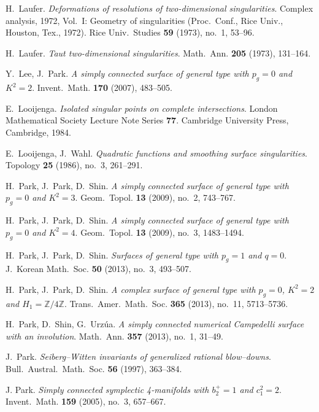 \documentclass[a4paper, reqno, twoside]{amsart}
\theoremstyle{definition}
\numberwithin{equation}{section}
\begin{document}
\begin{thebibliography}{99}
 H.~Laufer. \textit{Deformations of resolutions
  of two-dimensional singularities}. Complex analysis, 1972, Vol.~I:
  Geometry of singularities (Proc.~Conf., Rice Univ., Houston, Tex.,
  1972). Rice Univ.~Studies \textbf{59} (1973), no.~1, 53--96.

 H.~Laufer. \textit{Taut two-dimensional singularities}. Math.~Ann. \textbf{205} (1973), 131--164.

 Y.~Lee, J.~Park. \textit{A simply connected surface of general type with $p_g=0$ and $K^2=2$}. Invent.~Math. \textbf{170} (2007), 483--505.

 E.~Looijenga. \textit{Isolated singular points on complete intersections}. London Mathematical Society Lecture Note Series \textbf{77}. Cambridge University Press, Cambridge, 1984.

 E.~Looijenga, J.~Wahl. \textit{Quadratic functions and smoothing surface singularities}. Topology \textbf{25} (1986), no.~3, 261--291.

 H.~Park, J.~Park, D.~Shin. \textit{A simply connected surface of general type with $p_g=0$ and $K^2=3$}. Geom.~Topol. \textbf{13} (2009), no.~2, 743--767.

 H.~Park, J.~Park, D.~Shin. \textit{A simply connected surface of general type with $p_g=0$ and $K^2=4$}. Geom.~Topol. \textbf{13} (2009), no.~3, 1483--1494.

 H.~Park, J.~Park, D.~Shin. \textit{Surfaces of general type with $p_g=1$ and $q=0$}. J.~Korean Math.~Soc. \textbf{50} (2013), no.~3,
493--507.

 H.~Park, J.~Park, D.~Shin. \textit{A complex surface of general type with $p_g=0$, $K^2=2$ and $H_1=\mathbb{Z}/4\mathbb{Z}$}. Trans.~Amer.~Math.~Soc. \textbf{365} (2013), no.~11, 5713--5736.

 H.~Park, D.~Shin, G.~Urz\'ua. \textit{A simply connected numerical Campedelli surface with an involution}. Math.~Ann. \textbf{357} (2013), no.~1, 31--49.

 J.~Park. \textit{Seiberg--Witten invariants of generalized rational blow--downs}. Bull.~Austral.~Math.~Soc. \textbf{56} (1997), 363--384.

 J. Park. \textit{Simply connected symplectic 4-manifolds with $b_2^+=1$ and $c_1^2=2$}. Invent.~Math. \textbf{159} (2005), no.~3, 657--667.


\end{thebibliography}
\end{document}
